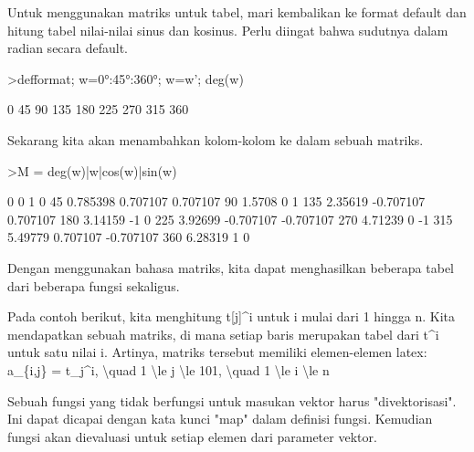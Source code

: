 \documentclass[a4paper,10pt]{article}
\begin{document}
\begin{eulernotebook}
\begin{eulercomment}
\begin{eulercomment}
\begin{eulercomment}
\begin{eulercomment}
\begin{eulercomment}
\begin{eulercomment}
\begin{euleroutput}
  [1,  2,  3,  4,  5,  6,  7,  8,  9]
\end{euleroutput}
\begin{eulercomment}
Untuk menggunakan matriks untuk tabel, mari kembalikan ke format
default dan hitung tabel nilai-nilai sinus dan kosinus. Perlu diingat
bahwa sudutnya dalam radian secara default.
\end{eulercomment}
\begin{eulerprompt}
>defformat; w=0°:45°:360°; w=w'; deg(w)
\end{eulerprompt}
\begin{euleroutput}
              0 
             45 
             90 
            135 
            180 
            225 
            270 
            315 
            360 
\end{euleroutput}
\begin{eulercomment}
Sekarang kita akan menambahkan kolom-kolom ke dalam sebuah matriks.
\end{eulercomment}
\begin{eulerprompt}
>M = deg(w)|w|cos(w)|sin(w)
\end{eulerprompt}
\begin{euleroutput}
              0             0             1             0 
             45      0.785398      0.707107      0.707107 
             90        1.5708             0             1 
            135       2.35619     -0.707107      0.707107 
            180       3.14159            -1             0 
            225       3.92699     -0.707107     -0.707107 
            270       4.71239             0            -1 
            315       5.49779      0.707107     -0.707107 
            360       6.28319             1             0 
\end{euleroutput}
\begin{eulercomment}
Dengan menggunakan bahasa matriks, kita dapat menghasilkan beberapa
tabel dari beberapa fungsi sekaligus.

Pada contoh berikut, kita menghitung t[j]\textasciicircum{}i untuk i mulai dari 1
hingga n. Kita mendapatkan sebuah matriks, di mana setiap baris
merupakan tabel dari t\textasciicircum{}i untuk satu nilai i. Artinya, matriks tersebut
memiliki elemen-elemen latex: a\_\{i,j\} = t\_j\textasciicircum{}i, \textbackslash{}quad 1 \textbackslash{}le j \textbackslash{}le 101,
\textbackslash{}quad 1 \textbackslash{}le i \textbackslash{}le n

Sebuah fungsi yang tidak berfungsi untuk masukan vektor harus
"divektorisasi". Ini dapat dicapai dengan kata kunci "map" dalam
definisi fungsi. Kemudian fungsi akan dievaluasi untuk setiap elemen
dari parameter vektor.


\end{eulercomment}
\end{eulercomment}
\end{eulercomment}
\end{eulercomment}
\end{eulercomment}
\end{eulercomment}
\end{eulercomment}
\end{eulernotebook}
\end{document}
